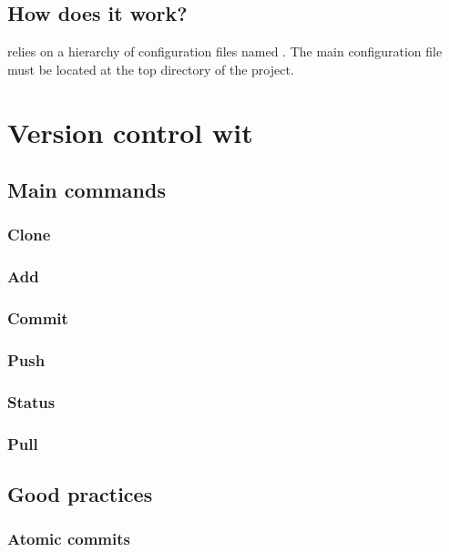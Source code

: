 \subsection{How does it work?}

\CMake relies on a hierarchy of configuration files named \CMakeLists. The main configuration file must be located at the top directory of the project.







\section{Version control wit \Git}


\subsection{Main commands}


\subsubsection{Clone}

\subsubsection{Add}

\subsubsection{Commit}


\subsubsection{Push}


\subsubsection{Status}


\subsubsection{Pull}


\subsection{Good practices}


\subsubsection{Atomic commits}

